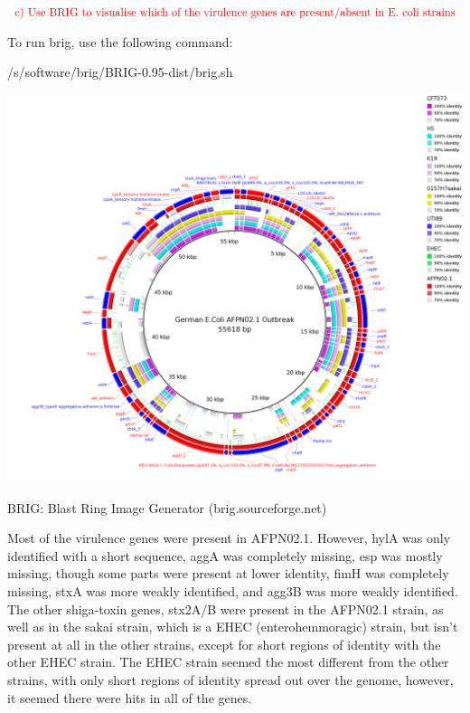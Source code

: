 \documentclass[]{article}
\newenvironment{Shaded}{\begin{snugshade}}{\end{snugshade}}
\newcommand{\ExtensionTok}[1]{#1}
\begin{document}
\(\color{red}{\text{c) Use BRIG to visualise which of the virulence genes are present/absent in E. coli strains}}\)

To run brig, use the following command:

\begin{Shaded}
\begin{Highlighting}[]
\ExtensionTok{/s/software/brig/BRIG-0.95-dist/brig.sh}
\end{Highlighting}
\end{Shaded}

\includegraphics{final_comparison_virulence.fasta.png}

\begin{center} BRIG: Blast Ring Image Generator (brig.sourceforge.net) \end{center}

Most of the virulence genes were present in AFPN02.1. However, hylA was
only identified with a short sequence, aggA was completely missing, esp
was mostly missing, though some parts were present at lower identity,
fimH was completely missing, stxA was more weakly identified, and agg3B
was more weakly identified. The other shiga-toxin genes, stx2A/B were
present in the AFPN02.1 strain, as well as in the sakai strain, which is
a EHEC (enterohemmoragic) strain, but isn't present at all in the other
strains, except for short regions of identity with the other EHEC
strain. The EHEC strain seemed the most different from the other
strains, with only short regions of identity spread out over the genome,
however, it seemed there were hits in all of the genes.
\end{document}
